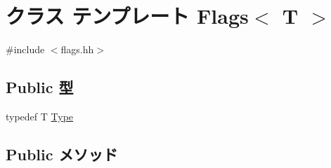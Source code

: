\hypertarget{classFlags}{
\section{クラス テンプレート Flags$<$ T $>$}
\label{classFlags}
}


{\ttfamily \#include $<$flags.hh$>$}\subsection*{Public 型}
\begin{DoxyCompactItemize}
\item 
typedef T \hyperlink{classFlags_a685b7a70f0ae1f2881cf8937d951c3b1}{Type}
\end{DoxyCompactItemize}
\subsection*{Public メソッド}
